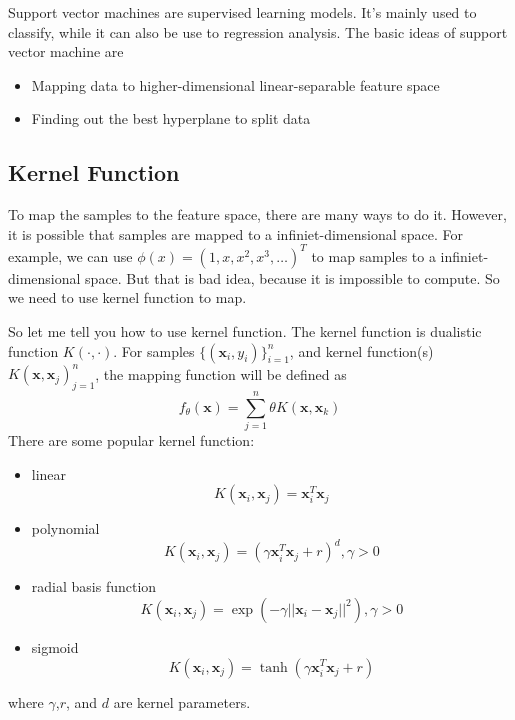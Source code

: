\documentclass[twoside]{article}
\begin{document}
Support vector machines are supervised learning models\cite{svm-wikipedia}. It's mainly used to classify,
while it can also be use to regression analysis.
The basic ideas of support vector machine are
\begin{itemize}
\item Mapping data to higher-dimensional linear-separable feature space
\item Finding out the best hyperplane to split data
\end{itemize}

\subsection{Kernel Function}
\label{sec:svm:kf}

To map the samples to the feature space, there are many ways to do it.
However, it is possible that samples are mapped to a infiniet-dimensional space.
For example, we can use $\phi(x)=(1,x,x^2,x^3,\dots)^T$ to map samples to a infiniet-dimensional space.
But that is bad idea, because it is impossible to compute.
So we need to use kernel function to map.

So let me tell you how to use kernel function.
The kernel function is dualistic function $K(\cdot,\cdot)$.
For samples $\{(\mathbf{x}_i,y_i)\}^n_{i=1}$, and kernel function(s) $K(\mathbf{x},\mathbf{x}_j)^n_{j=1}$,
the mapping function\cite{GraphML1} will be defined as
\begin{equation}
  \label{eq:mapping}
  f_\theta(\mathbf{x})=\sum\limits_{j=1}^{n}\theta K(\mathbf{x},\mathbf{x}_k)
\end{equation}
There are some popular kernel function:
\begin{itemize}
\item linear
  \begin{equation}
    \label{eq:kf:linear}
    K(\mathbf{x}_i,\mathbf{x}_j) = \mathbf{x}_i^T\mathbf{x}_j
  \end{equation}
\item polynomial
  \begin{equation}
    \label{eq:kf:polynomial}
    K(\mathbf{x}_i,\mathbf{x}_j) = \left(\gamma \mathbf{x}_i^T\mathbf{x}_j+r\right)^d,\gamma > 0
  \end{equation}
\item radial basis function
  \begin{equation}
    \label{eq:kf:rbf}
    K(\mathbf{x}_i,\mathbf{x}_j) = \exp{\left(-\gamma||\mathbf{x}_i-\mathbf{x}_j||^2\right)},\gamma > 0
  \end{equation}
\item sigmoid
  \begin{equation}
    \label{eq:kf:sigmoid}
    K(\mathbf{x}_i,\mathbf{x}_j) = \tanh{\left(\gamma \mathbf{x}_i^T\mathbf{x}_j+r\right)}
  \end{equation}
\end{itemize}
where $\gamma$,$r$, and $d$ are kernel parameters.
\end{document}
